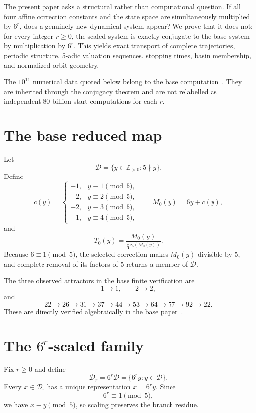 \documentclass[11pt]{article}
\begin{document}
The present paper asks a structural rather than computational question. If all four affine correction constants and the state space are simultaneously multiplied by $6^r$, does a genuinely new dynamical system appear? We prove that it does not: for every integer $r\ge0$, the scaled system is exactly conjugate to the base system by multiplication by $6^r$. This yields exact transport of complete trajectories, periodic structure, 5-adic valuation sequences, stopping times, basin membership, and normalized orbit geometry.

The $10^{11}$ numerical data quoted below belong to the base computation~\cite{BanazadehBase2026}. They are inherited through the conjugacy theorem and are not relabelled as independent $80$-billion-start computations for each $r$.

\section{The base reduced map}
Let
\[
\mathcal D=\{y\in\mathbb Z_{>0}:5\nmid y\}.
\]
Define
\[
c(y)=\begin{cases}-1,&y\equiv1\pmod5,\\-2,&y\equiv2\pmod5,\\+2,&y\equiv3\pmod5,\\+1,&y\equiv4\pmod5,\end{cases}
\qquad M_0(y)=6y+c(y),
\]
and
\begin{equation}T_0(y)=\frac{M_0(y)}{5^{\nu_5(M_0(y))}}.\label{eq:base}\end{equation}
Because $6\equiv1\pmod5$, the selected correction makes $M_0(y)$ divisible by 5, and complete removal of its factors of 5 returns a member of $\mathcal D$.

The three observed attractors in the base finite verification are
\[
1\to1,\qquad2\to2,
\]
and
\begin{equation}22\to26\to31\to37\to44\to53\to64\to77\to92\to22.\label{eq:basecycle}\end{equation}
These are directly verified algebraically in the base paper~\cite{BanazadehBase2026}.

\section{The $6^r$-scaled family}
Fix $r\ge0$ and define
\begin{equation}\mathcal D_r=6^r\mathcal D=\{6^r y:y\in\mathcal D\}.\label{eq:domain}\end{equation}
Every $x\in\mathcal D_r$ has a unique representation $x=6^r y$. Since
\begin{equation}6^r\equiv1\pmod5,\label{eq:residue}\end{equation}
we have $x\equiv y\pmod5$, so scaling preserves the branch residue.
\end{document}
